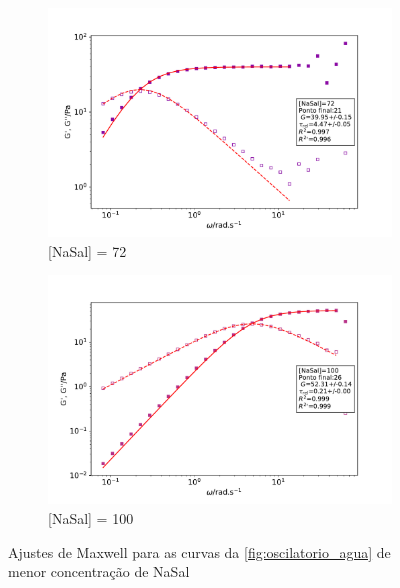 \begin{figure}[h]
			\begin{subfigure}[t]{0.5\textwidth}
				\includegraphics[width=\textwidth]{imagens/reologia/oscilatorio_agua_72}
				\caption{[NaSal] = 72\mM}
				\label{fig:oscilatorio_agua_72}
			\end{subfigure} %
			\begin{subfigure}[t]{0.5\textwidth}
				\includegraphics[width=\textwidth]{imagens/reologia/oscilatorio_agua_100}
				\caption{[NaSal] = 100\mM}
				\label{fig:oscilatorio_agua_100}
			\end{subfigure}
		
		\caption{Ajustes de Maxwell para as curvas da \autoref{fig:oscilatorio_agua} de menor concentração de NaSal}
		\label{fig:oscilatorio_agua_maxwell1}
		\end{figure}
	
